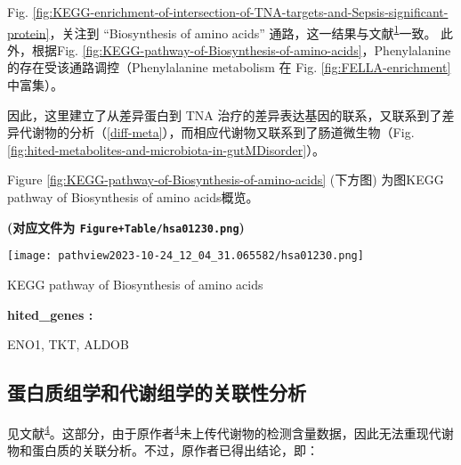 \documentclass[
]{article}
\begin{document}
Fig. \ref{fig:KEGG-enrichment-of-intersection-of-TNA-targets-and-Sepsis-significant-protein}，关注到
``Biosynthesis of amino acids'' 通路，这一结果与文献\textsuperscript{\protect\hyperlink{ref-IntegrativeAnaChen2022}{1}}一致。
此外，根据Fig. \ref{fig:KEGG-pathway-of-Biosynthesis-of-amino-acids}，Phenylalanine 的存在受该通路调控（Phenylalanine metabolism 在 Fig. \ref{fig:FELLA-enrichment} 中富集）。

因此，这里建立了从差异蛋白到 TNA 治疗的差异表达基因的联系，又联系到了差异代谢物的分析（\ref{diff-meta}），而相应代谢物又联系到了肠道微生物（Fig. \ref{fig:hited-metabolites-and-microbiota-in-gutMDisorder}）。

Figure \ref{fig:KEGG-pathway-of-Biosynthesis-of-amino-acids} (下方图) 为图KEGG pathway of Biosynthesis of amino acids概览。

\textbf{(对应文件为 \texttt{Figure+Table/hsa01230.png})}

\def\@captype{figure}
\begin{center}
\texttt{[image: pathview2023-10-24\_12\_04\_31.065582/hsa01230.png]}
\caption{KEGG pathway of Biosynthesis of amino acids}\label{fig:KEGG-pathway-of-Biosynthesis-of-amino-acids}
\end{center}

\begin{center}\begin{tcolorbox}[colback=gray!10, colframe=gray!50, width=0.9\linewidth, arc=1mm, boxrule=0.5pt]
\textbf{
hited\_genes
:}

\vspace{0.5em}

    ENO1, TKT, ALDOB

\vspace{2em}
\end{tcolorbox}
\end{center}

\hypertarget{ux86cbux767dux8d28ux7ec4ux5b66ux548cux4ee3ux8c22ux7ec4ux5b66ux7684ux5173ux8054ux6027ux5206ux6790}{%
\subsection{蛋白质组学和代谢组学的关联性分析}\label{ux86cbux767dux8d28ux7ec4ux5b66ux548cux4ee3ux8c22ux7ec4ux5b66ux7684ux5173ux8054ux6027ux5206ux6790}}

见文献\textsuperscript{\protect\hyperlink{ref-SerumProteomicLiang2021}{4}}。这部分，由于原作者\textsuperscript{\protect\hyperlink{ref-SerumProteomicLiang2021}{4}}未上传代谢物的检测含量数据，因此无法重现代谢物和蛋白质的关联分析。不过，原作者已得出结论，即：
\end{document}
